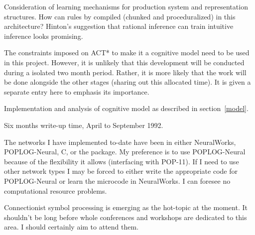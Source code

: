 Consideration of learning mechanisms for production system and
representation structures. How can rules by compiled (chunked and
proceduralized) in this architecture?  Hinton's suggestion that
rational inference can train intuitive inference looks promising.


The constraints imposed on ACT* to make it a cognitive model
need to be used in this project.  However, it is unlikely that
this development will be conducted during a isolated two
month period.  Rather, it is more likely that the work will
be done alongside the other stages (sharing out this
allocated time).  It is given a separate entry here to
emphasis its importance.


Implementation and analysis of cognitive model as described in
section~\ref{model}.

\dur{}

Six months write-up time, April to September 1992.

\dur{}

The networks I have implemented to-date have
been in either NeuralWorks,
POPLOG-Neural, C, or the  package.  My preference is
to use POPLOG-Neural because of the flexibility it allows (interfacing
with POP-11).  If I need to use other network types I may be
forced to either write the appropriate code for POPLOG-Neural or
learn the microcode in NeuralWorks.  I can foresee no computational
resource problems.

Connectionist symbol processing is emerging as the hot-topic at
the moment.  It shouldn't be long before whole conferences and
workshops are dedicated to this area.  I should certainly aim
to attend them.

\pagethrow
{}


